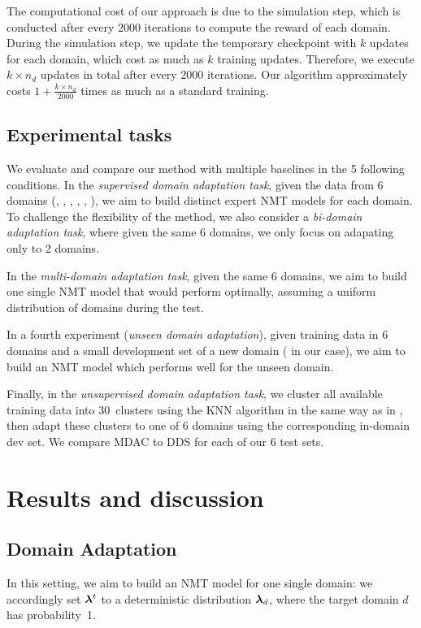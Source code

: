 The computational cost of our approach is due to the simulation step, which is conducted after every 2000 iterations to compute the reward of each domain. During the simulation step, we update the temporary checkpoint with $k$ updates for each domain, which cost as much as $k$ training updates. Therefore, we execute $k \times n_d$ updates in total after every 2000 iterations. Our algorithm approximately costs $1 + \frac{k \times n_d}{2000}$ times as much as a standard training.

\subsection{Experimental tasks}
We evaluate and compare our method with multiple baselines in the 5 following conditions.
In the \emph{supervised domain adaptation task}, given the data from 6 domains (, , , , , ), we aim to build distinct expert NMT models for each domain. To challenge the flexibility of the method, we also consider a \emph{bi-domain adaptation task}, where given the same 6 domains, we only focus on adapating only to 2 domains.

In the \emph{multi-domain adaptation task}, given the same 6 domains, we aim to build one single NMT model that would perform optimally, assuming a uniform distribution of domains during the test.

In a fourth experiment (\emph{unseen domain adaptation}), given training data in 6 domains and a small development set of a new domain ( in our case), we aim to build an NMT model which performs well for the unseen domain.

Finally, in the \emph{unsupervised domain adaptation task}, we cluster all available training data into 30~clusters using the KNN algorithm in the same way as in \citep{Tars18multidomain}, then adapt these clusters to one of 6 domains using the corresponding in-domain dev set. We compare MDAC to DDS for each of our 6 test sets.

\section{Results and discussion \label{sec:results-chap7}}
\subsection{Domain Adaptation}\label{ssec:da-chap7}
In this setting, we aim to build an NMT model for one single domain: we accordingly set $\bm{\lambda}^t$ to a deterministic distribution $\bm{\lambda}_d$, where the target domain $d$ has probability~1.

